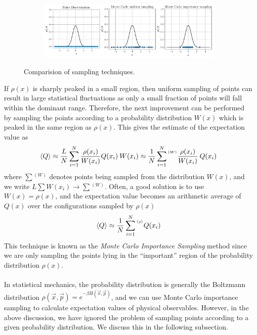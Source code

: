 \documentclass[../journal_main.tex]{subfiles}
\begin{document}
\begin{figure}[!htb]
    \centering
    \begin{subfigure}[b]{1.0\textwidth}  %
        \centering
        \includegraphics[width=\textwidth]{images/monte_carlo/sampling.pdf}
    \end{subfigure}
    \caption{Comparision of sampling techniques.}
    \label{}
\end{figure}
\FloatBarrier \!\!\!\!\!\!\!\!\!\!\!
If $\rho(x)$ is sharply peaked in a small region, then uniform sampling of points can result in large statistical fluctuations as only a small fraction of points will fall within the dominant range. Therefore, the next improvement can be performed by sampling the points according to a probability distribution $W(x)$ which is peaked in the same region as $\rho(x)$. This gives the estimate of the expectation value as 
\begin{equation}
    \expval{Q} \approx \frac{L}{N} \sum_{i=1}^N \frac{\rho(x_i)}{W(x_i)} Q(x_i) \: W(x_i) \approx \frac{1}{N} \sum_{i=1}^N {}^{{}^{(W)}} \frac{\rho(x_i)}{W(x_i)} \: Q(x_i)
\end{equation}  
where $\sum {}^{(W)}$ denotes points being sampled from the distribution $W(x)$, and we write $L \sum W(x_i) \to \sum {{}^{(W)}}$. Often, a good solution is to use $W(x) = \rho(x)$, and the expectation value becomes an arithmetic average of $Q(x)$ over the configurations sampled by $\rho(x)$
\begin{equation}
    \expval{Q} \approx \frac{1}{N} \sum_{i=1}^N {}^{{}^{(\rho)}} Q(x_i)
\end{equation}
This technique is known as the \textit{Monte Carlo Importance Sampling} method since we are only sampling the points lying in the ``important'' region of the probability distribution $\rho(x)$.~\\~\\
In statistical mechanics, the probability distribution is generally the Boltzmann distribution $\rho(\vec{x}, \vec{p}) = e^{-\beta H (\vec{x},\vec{p})}$, and we can use Monte Carlo importance sampling to calculate expectation values of physical observables. However, in the above discussion, we have ignored the problem of sampling points according to a given probability distribution. We discuss this in the following subsection.
\end{document}
